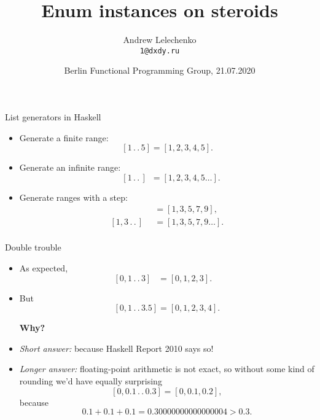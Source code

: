 \documentclass[handout]{beamer}
\title{Enum instances on steroids}
\author[Andrew Lelechenko]{Andrew Lelechenko \\ \texttt{1@dxdy.ru}}
\institute[Barclays]{Barclays, London}
\date{Berlin Functional Programming Group, 21.07.2020}
\def\dd{\,.\,.\,}
\begin{document}
\begin{frame}
  \titlepage
\end{frame}

\begin{frame}{List generators in Haskell}

\begin{itemize}[<+->]

\item Generate a finite range:
$$
\phantom{,3} [1\dd5] = [1,2,3,4,5].\phantom{\ldots}
$$

\item Generate an infinite range:
$$
\phantom{,3} [1\dd] \phantom{5} = [1,2,3,4,5\ldots].
$$

\item Generate ranges with a step:
\begin{align*}
[1,3\dd9] &= [1,3,5,7,9], \\
[1,3\dd] \phantom{9} &= [1,3,5,7,9\ldots]. \\
\end{align*}
\end{itemize}

\end{frame}

\begin{frame}{Double trouble}

\begin{itemize}[<+->]

\item As expected,
$$[0,1\dd3] \phantom{.5} = [0,1,2,3]. \phantom{,4} $$

\item But
$$ [0,1\dd3.5] = [0,1,2,3,4]. $$

\centerline{\bf Why?}

\bigskip

\item {\em Short answer:} because Haskell Report 2010 says so!

\item {\em Longer answer:} floating-point arithmetic is not exact, so
      without some kind of rounding we'd have equally surprising
      $$ [0,0.1\dd0.3] = [0,0.1,0.2], $$
      because
      $$ 0.1+0.1+0.1 = 0.30000000000000004 > 0.3. $$

\end{itemize}

\end{frame}
\end{document}
